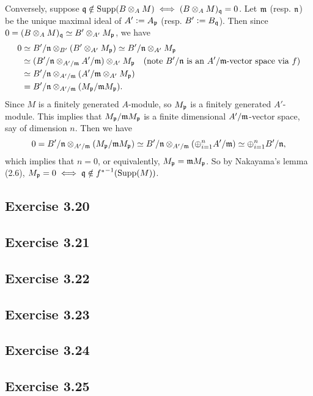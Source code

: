 \documentclass[../A&M.tex]{subfiles}
\begin{document}
Conversely, suppose $\mathfrak{q} \notin \operatorname{Supp}(B \otimes_A M) \iff (B \otimes_A M)_{\mathfrak{q}}=0$. Let $\mathfrak{m}$ (resp. $\mathfrak{n}$) be the unique maximal ideal of $A':=A_{\mathfrak{p}}$ (resp. $B':=B_{\mathfrak{q}}$). Then since $0 = (B \otimes_A M)_{\mathfrak{q}} \simeq B' \otimes_{A'} M_{\mathfrak{p}}$, we have
\begin{align*}
0
&\simeq B'/\mathfrak{n} \otimes_{B'} (B' \otimes_{A'} M_{\mathfrak{p}})  
\simeq B'/\mathfrak{n} \otimes_{A'} M_{\mathfrak{p}}   \\
&\simeq (B'/\mathfrak{n} \otimes_{A'/\mathfrak{m}} A'/\mathfrak{m}) \otimes_{A'} M_{\mathfrak{p}}  \quad \text{(note $B'/\mathfrak{n}$ is an $A'/\mathfrak{m}$-vector space via $f$)}  \\
&\simeq B'/\mathfrak{n} \otimes_{A'/\mathfrak{m}} (A'/\mathfrak{m} \otimes_{A'} M_{\mathfrak{p}})     \\
&
= B'/\mathfrak{n} \otimes_{A'/\mathfrak{m}} (M_{\mathfrak{p}}/\mathfrak{m} M_{\mathfrak{p}}).
\end{align*}
Since $M$ is a finitely generated $A$-module, so $M_{\mathfrak{p}}$ is a finitely generated $A'$-module. This implies that $M_{\mathfrak{p}}/\mathfrak{m} M_{\mathfrak{p}}$ is a finite dimensional $A'/\mathfrak{m}$-vector space, say of dimension $n$. Then we have
$$
0 = B'/\mathfrak{n} \otimes_{A'/\mathfrak{m}} (M_{\mathfrak{p}}/\mathfrak{m} M_{\mathfrak{p}})
\simeq B'/\mathfrak{n} \otimes_{A'/\mathfrak{m}} ( \oplus_{i=1}^n A'/\mathfrak{m})
\simeq \oplus_{i=1}^n B'/\mathfrak{n},
$$
which implies that $n=0$, or equivalently, $M_{\mathfrak{p}} = \mathfrak{m} M_{\mathfrak{p}}$. So by Nakayama's lemma (2.6), $M_{\mathfrak{p}} = 0 \iff \mathfrak{q} \notin {f^*}^{-1}(\operatorname{Supp}(M))$.

\subsection*{Exercise 3.20}

\subsection*{Exercise 3.21}

\subsection*{Exercise 3.22}

\subsection*{Exercise 3.23}

\subsection*{Exercise 3.24}

\subsection*{Exercise 3.25}
\end{document}
